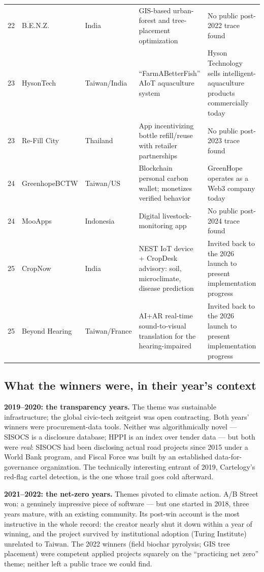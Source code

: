 \begin{table}[htbp]
\begin{tabularx}{\textwidth}{@{}p{}p{}p{}Xp{}@{}}
22 & B.E.N.Z. & India & GIS-based urban-forest and tree-placement optimization\cite{hist2023} & No public post-2022 trace found \\
23 & HysonTech & Taiwan/India & ``FarmABetterFish'' AIoT aquaculture system\cite{moda2023} & Hyson Technology sells intelligent-aquaculture products commercially today\cite{hyson} \\
23 & Re-Fill City & Thailand & App incentivizing bottle refill/reuse with retailer partnerships\cite{moda2023} & No public post-2023 trace found \\
24 & GreenhopeBCTW & Taiwan/US & Blockchain personal carbon wallet; monetizes verified behavior\cite{moda2024} & GreenHope operates as a Web3 company today\cite{greenhope} \\
24 & MooApps & Indonesia & Digital livestock-monitoring app\cite{moda2024} & No public post-2024 trace found \\
25 & CropNow & India & NEST IoT device + CropDesk advisory: soil, microclimate, disease prediction\cite{focuscrop} & Invited back to the 2026 launch to present implementation progress\cite{moda2026} \\
25 & Beyond Hearing & Taiwan/France & AI+AR real-time sound-to-visual translation for the hearing-impaired\cite{pres2025} & Invited back to the 2026 launch to present implementation progress\cite{moda2026} \\
\bottomrule
\end{tabularx}
\end{table}

\subsection{What the winners were, in their year's context}

\textbf{2019--2020: the transparency years.} The theme was sustainable
infrastructure; the global civic-tech zeitgeist was open contracting. Both
years' winners were procurement-data tools. Neither was algorithmically novel
--- SISOCS is a disclosure database; HPPI is an index over tender data --- but
both were \emph{real}: SISOCS had been disclosing actual road projects since
2015 under a World Bank program\cite{cost}, and Fiscal Force was built by an
established data-for-governance organization\cite{ocpindia}. The technically
interesting entrant of 2019, Cartelogy's red-flag cartel detection, is the one
whose trail goes cold afterward.

\textbf{2021--2022: the net-zero years.} Themes pivoted to climate action.
A/B Street won: a genuinely impressive piece of software --- but one started
in 2018, three years mature, with an existing community\cite{abstreet}. Its
post-win account is the most instructive in the whole record: the creator
nearly shut it down within a year of winning, and the project survived by
institutional adoption (Turing Institute) unrelated to
Taiwan\cite{abinterview}. The 2022 winners (field biochar pyrolysis; GIS tree
placement) were competent applied projects squarely on the ``practicing net
zero'' theme\cite{hist2023}; neither left a public trace we could find.

